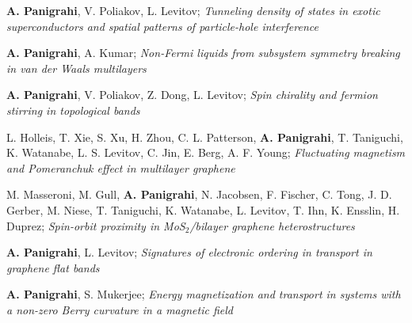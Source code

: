

\begin{cventries}

  \cventry
    {} %
    {} %
    {} %
    {} %
    {
	  \begin{cvitems} %
	  	\item{\textbf{A. Panigrahi}, V. Poliakov, L. Levitov; \textit{Tunneling density of states in exotic superconductors and spatial patterns of particle-hole interference} }
	  	\item{\textbf{A. Panigrahi}, A. Kumar; \textit{Non-Fermi liquids from subsystem symmetry breaking in van der Waals multilayers} }
	  	\item{\textbf{A. Panigrahi}, V. Poliakov, Z. Dong, L. Levitov; \textit{Spin chirality and fermion stirring in topological bands}
	  		}
	  	\item{L. Holleis, T. Xie, S. Xu, H. Zhou, C. L. Patterson, \textbf{A. Panigrahi}, T. Taniguchi, K. Watanabe, L. S. Levitov, C. Jin, E. Berg, A. F. Young; \textit{Fluctuating magnetism and Pomeranchuk effect in multilayer graphene}
	  	}
	  	\item{M. Masseroni, M. Gull, \textbf{A. Panigrahi}, N. Jacobsen, F. Fischer, C. Tong, J. D. Gerber, M. Niese, T. Taniguchi, K. Watanabe, L. Levitov, T. Ihn, K. Ensslin, H. Duprez; \textit{Spin-orbit proximity in MoS$_2$/bilayer graphene heterostructures}
	  		}
	  	\item{\textbf{A. Panigrahi}, L. Levitov; \textit{Signatures of electronic ordering in transport in graphene flat bands} }
	  	\item{\textbf{A. Panigrahi}, S. Mukerjee; \textit{Energy magnetization and transport in systems with a non-zero Berry curvature in a magnetic field}
}
\end{cvitems}}
\end{cventries}
